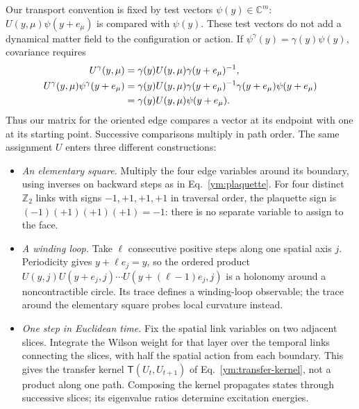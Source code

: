 Our transport convention is fixed by test vectors $\psi(y)\in\mathbb C^m$:
$U(y,\mu)\psi(y+e_\mu)$ is compared with $\psi(y)$. These test vectors do
not add a dynamical matter field to the configuration or action.
If $\psi^\gamma(y)=\gamma(y)\psi(y)$, covariance requires
\begin{align}
 U^\gamma(y,\mu)&=\gamma(y)U(y,\mu)\gamma(y+e_\mu)^{-1},
 \label{ym:link-gauge}\\
 U^\gamma(y,\mu)\psi^\gamma(y+e_\mu)
 &=\gamma(y)U(y,\mu)\gamma(y+e_\mu)^{-1}
   \gamma(y+e_\mu)\psi(y+e_\mu)\notag\\
 &=\gamma(y)U(y,\mu)\psi(y+e_\mu).
 \label{ym:link-transport}
\end{align}
Thus our matrix for the oriented edge compares a vector at its endpoint
with one at its starting point. Successive comparisons multiply in path
order. The same assignment $U$ enters three different constructions:
\begin{itemize}
\item \emph{An elementary square.} Multiply the four edge variables around
its boundary, using inverses on backward steps as in Eq.~\eqref{ym:plaquette}.
For four distinct $\mathbb Z_2$ links with signs $-1,+1,+1,+1$ in traversal
order, the plaquette sign is $(-1)(+1)(+1)(+1)=-1$: there is no separate
variable to assign to the face.
\item \emph{A winding loop.} Take $\ell$ consecutive positive steps along
one spatial axis $j$. Periodicity gives $y+\ell e_j=y$, so the ordered
product $U(y,j)U(y+e_j,j)\cdots U(y+(\ell-1)e_j,j)$ is a holonomy around
a noncontractible circle. Its trace defines a winding-loop observable;
the trace around the elementary square probes local curvature instead.
\item \emph{One step in Euclidean time.} Fix the spatial link variables on
two adjacent slices. Integrate the Wilson weight for that layer over
the temporal links connecting the slices, with half the spatial action
from each boundary. This gives the transfer kernel
$\mathsf T(U_t,U_{t+1})$ of Eq.~\eqref{ym:transfer-kernel}, not a product
along one path. Composing the kernel propagates states through successive
slices; its eigenvalue ratios determine excitation energies.
\end{itemize}

